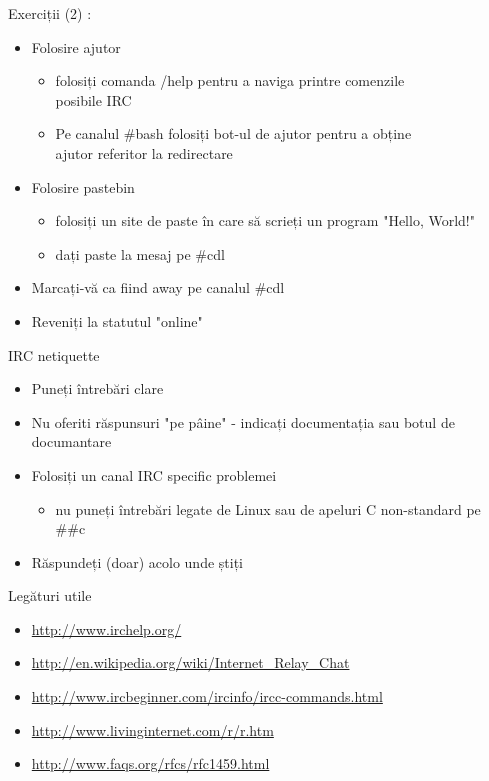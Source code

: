 \documentclass{beamer}
\begin{document}
    \begin{frame}{Exerciții (2) :}
    \begin{itemize}
    \setlength{\itemsep}{0.5cm}
    \item Folosire ajutor
        \begin{itemize}
        \item folosiți comanda /help pentru a naviga printre comenzile \\
            posibile IRC
        \item Pe canalul \#bash folosiți bot-ul de ajutor pentru a obține \\
            ajutor referitor la redirectare
        \end{itemize}
    \item Folosire pastebin
        \begin{itemize}
        \item folosiți un site de paste în care să scrieți un program "Hello, World!"
        \item dați paste la mesaj pe \#cdl
        \end{itemize}
    \item Marcați-vă ca fiind away pe canalul \#cdl
    \item Reveniți la statutul "online"
    \end{itemize}
    \end{frame}

    \begin{frame}{IRC netiquette}
    \begin{itemize}
    \setlength{\itemsep}{0.5cm}
    \item Puneți întrebări clare
    \item Nu oferiti răspunsuri "pe pâine" - indicați documentația sau botul de documantare
    \item Folosiți un canal IRC specific problemei
        \begin{itemize}
        \item nu puneți întrebări legate de Linux sau de apeluri C non-standard pe \#\#c
        \end{itemize}
    \item Răspundeți (doar) acolo unde știți
    \end{itemize}
    \end{frame}

    \begin{frame}{Legături utile}
    \begin{itemize}
    \setlength{\itemsep}{0.5cm}
    \item \url{http://www.irchelp.org/}
    \item \url{http://en.wikipedia.org/wiki/Internet\_Relay\_Chat}
    \item \url{http://www.ircbeginner.com/ircinfo/ircc-commands.html}
    \item \url{http://www.livinginternet.com/r/r.htm}
    \item \url{http://www.faqs.org/rfcs/rfc1459.html}
    \end{itemize}
    \end{frame}
\end{document}
